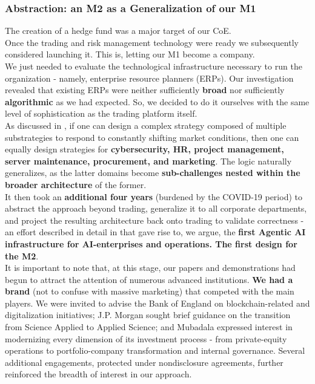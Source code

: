 \documentclass{article}
\begin{document}
\subsubsection{Abstraction: an M2 as a Generalization of our M1}
\label{subsubsection: Abstraction: an M2 as a Generalization of our M1}

The creation of a hedge fund was a major target of our CoE.\\

Once the trading and risk management technology were ready we subsequently considered launching it. This is, letting our M1 become a company.\\

We just needed to evaluate the technological infrastructure necessary to run the organization - namely, enterprise resource planners (ERPs). Our investigation revealed that existing ERPs were neither sufficiently \textbf{broad} nor sufficiently \textbf{algorithmic} as we had expected. So, we decided to do it ourselves with the same level of sophistication as the trading platform itself.\\

As discussed in \cite{Vertical Integration}, if one can design a complex strategy composed of multiple substrategies to respond to constantly shifting market conditions, then one can equally design strategies for \textbf{cybersecurity, HR, project management, server maintenance, procurement, and marketing}. The logic naturally generalizes, as the latter domains become \textbf{sub-challenges nested within the broader architecture} of the former.\\

It then took an \textbf{additional four years} (burdened by the COVID-19 period) to abstract the approach beyond trading, generalize it to all corporate departments, and project the resulting architecture back onto trading to validate correctness - an effort described in detail in \cite{Data MAPs} that gave rise to, we argue, the \textbf{first Agentic AI infrastructure for AI-enterprises and operations. The first design for the M2}.\\

It is important to note that, at this stage, our papers and demonstrations had begun to attract the attention of numerous advanced institutions. \textbf{We had a brand} (not to confuse with massive marketing) that competed with the main players. We were invited to advise the Bank of England on blockchain-related and digitalization initiatives; J.P. Morgan sought brief guidance on the transition from Science Applied to Applied Science; and Mubadala expressed interest in modernizing every dimension of its investment process - from private-equity operations to portfolio-company transformation and internal governance. Several additional engagements, protected under nondisclosure agreements, further reinforced the breadth of interest in our approach.\\
\end{document}
